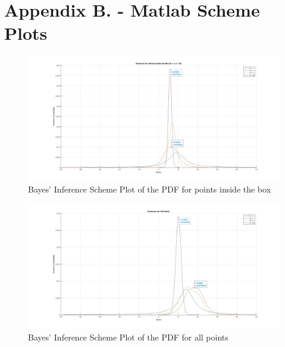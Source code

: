 \documentclass[a4paper,11pt]{article}
\begin{document}
\newpage
\section{Appendix B. - Matlab Scheme Plots}

\begin{figure}[h]
        \centering
        \includegraphics[scale=0.2]{q07pdfinbox.jpg} 
        \caption{Bayes' Inference Scheme Plot of the PDF for points inside the box}
\end{figure}	

\begin{figure}[h]
        \centering
        \includegraphics[scale=0.2]{q07pdfoutbox.jpg} 
        \caption{Bayes' Inference Scheme Plot of the PDF for all points}
\end{figure}	

\newpage
\end{document}
